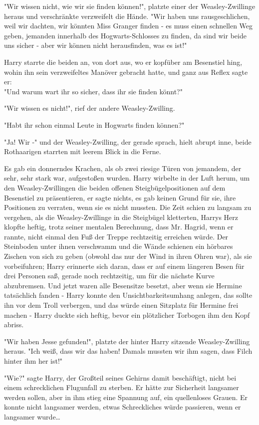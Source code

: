 {"Wir wissen nicht, wie wir sie finden können!", platzte einer der Weasley-Zwillinge heraus und verschränkte verzweifelt die Hände. "Wir haben uns rausgeschlichen, weil wir dachten, wir könnten Miss Granger finden - es muss einen schnellen Weg geben, jemanden innerhalb des Hogwarts-Schlosses zu finden, da sind wir beide uns sicher - aber wir können nicht herausfinden, was es ist!"

Harry starrte die beiden an, von dort aus, wo er kopfüber am Besenstiel hing, wohin ihn sein verzweifeltes Manöver gebracht hatte, und ganz aus Reflex sagte er:\\ "Und warum wart ihr so sicher, dass ihr sie finden könnt?"

"Wir wissen es nicht!", rief der andere Weasley-Zwilling.

"Habt ihr schon einmal Leute in Hogwarts finden können?"

"Ja! Wir -" und der Weasley-Zwilling, der gerade sprach, hielt abrupt inne, beide Rothaarigen starrten mit leerem Blick in die Ferne.

Es gab ein donnerndes Krachen, als ob zwei riesige Türen von jemandem, der sehr, sehr stark war, aufgestoßen wurden. Harry wirbelte in der Luft herum, um den Weasley-Zwillingen die beiden offenen Steigbügelpositionen auf dem Besenstiel zu präsentieren, er sagte nichts, es gab keinen Grund für sie, ihre Positionen zu verraten, wenn sie es nicht mussten. Die Zeit schien zu langsam zu vergehen, als die Weasley-Zwillinge in die Steigbügel kletterten, Harrys Herz klopfte heftig, trotz seiner mentalen Berechnung, dass Mr. Hagrid, wenn er rannte, nicht einmal den Fuß der Treppe rechtzeitig erreichen würde. Der Steinboden unter ihnen verschwamm und die Wände schienen ein hörbares Zischen von sich zu geben (obwohl das nur der Wind in ihren Ohren war), als sie vorbeifuhren; Harry erinnerte sich daran, dass er auf einem längeren Besen für drei Personen saß, gerade noch rechtzeitig, um für die nächste Kurve abzubremsen. Und jetzt waren alle Besensitze besetzt, aber wenn sie Hermine tatsächlich fanden - Harry konnte den Unsichtbarkeitsumhang anlegen, das sollte ihn vor dem Troll verbergen, und das würde einen Sitzplatz für Hermine frei machen - Harry duckte sich heftig, bevor ein plötzlicher Torbogen ihm den Kopf abriss.

"Wir haben Jesse gefunden!", platzte der hinter Harry sitzende Weasley-Zwilling heraus. "Ich weiß, dass wir das haben! Damals mussten wir ihm sagen, dass Filch hinter ihm her ist!"

"Wie?" sagte Harry, der Großteil seines Gehirns damit beschäftigt, nicht bei einem schrecklichen Flugunfall zu sterben. Er hätte zur Sicherheit langsamer werden sollen, aber in ihm stieg eine Spannung auf, ein quellenloses Grauen. Er konnte nicht langsamer werden, etwas Schreckliches würde passieren, wenn er langsamer wurde…

}
